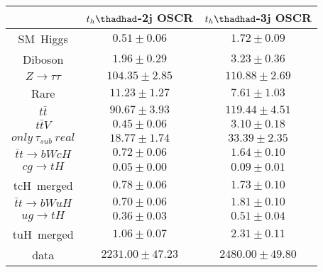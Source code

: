 \centering
\begin{tabular}{ccc} \toprule\toprule
 & $t_{h}\thadhad$-2j OSCR & $t_{h}\thadhad$-3j OSCR\\  \midrule
SM~Higgs & $0.51\pm0.06$ & $1.72\pm0.09$\\
Diboson & $1.96\pm0.29$ & $3.23\pm0.36$\\
$Z\to\tau\tau$ & $104.35\pm2.85$ & $110.88\pm2.69$\\
Rare & $11.23\pm1.27$ & $7.61\pm1.03$\\
$t\bar{t}$ & $90.67\pm3.93$ & $119.44\pm4.51$\\
$t\bar{t}V$ & $0.45\pm0.06$ & $3.10\pm0.18$\\
$only~\tau_{sub}~real$ & $18.77\pm1.74$ & $33.39\pm2.35$\\\midrule
$\bar{t}t\to bWcH$ & $0.72\pm0.06$ & $1.64\pm0.10$\\
$cg\to tH$ & $0.05\pm0.00$ & $0.09\pm0.01$\\
tcH~merged & $0.78\pm0.06$ & $1.73\pm0.10$\\
$\bar{t}t\to bWuH$ & $0.70\pm0.06$ & $1.81\pm0.10$\\
$ug\to tH$ & $0.36\pm0.03$ & $0.51\pm0.04$\\
tuH~merged & $1.06\pm0.07$ & $2.31\pm0.11$\\\midrule
data & $2231.00\pm47.23$ & $2480.00\pm49.80$\\
\bottomrule\bottomrule
\end{tabular}

